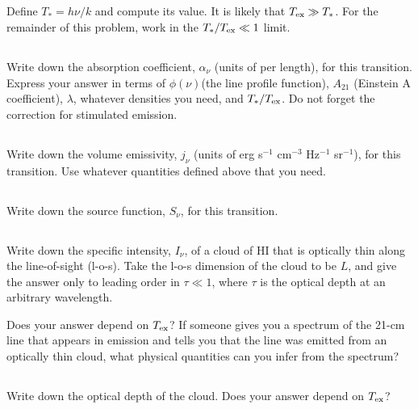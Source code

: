 \documentclass[11pt]{article}
\begin{document}
\def\Ts{{T_*}}
\subsection{}
Define $\Ts=h\nu/k$ and compute its value.
It is likely that $\Tex\gg\Ts$. For the remainder of this problem, work in the $\Ts/\Tex\ll1$
limit.

\subsection{}
Write down the absorption coefficient, $\alpha_\nu$ (units of per length), for
this transition. Express your answer in terms of $\phi(\nu)$(the line profile
function), $A_{21}$ (Einstein A coefficient), $\lambda$, whatever densities you need, and
$\Ts/\Tex$. Do not forget the correction for stimulated emission.

\subsection{}
Write down the volume emissivity, $j_\nu$ (units of erg s$^{-1}$ cm$^{-3}$ Hz$^{-1}$ sr$^{-1}$), for
this transition. Use whatever quantities defined above that you need.

\subsection{}
Write down the source function, $S_\nu$, for this transition.

\subsection{}
Write down the specific intensity, $I_\nu$, of a cloud of HI that is optically
thin along the line-of-sight (l-o-s). Take the l-o-s dimension of the cloud to
be $L$, and give the answer only to leading order in $\tau\ll1$, where $\tau$ is the
optical depth at an arbitrary wavelength.

Does your answer depend on ${T_{\rm ex}}$?  If someone gives you a spectrum of the 21-cm
line that appears in emission and tells you that the line was emitted from an
optically thin cloud, what physical quantities can you infer from the spectrum?

\subsection{}
Write down the optical depth of the cloud. Does your answer depend on ${T_{\rm ex}}$?
\end{document}
